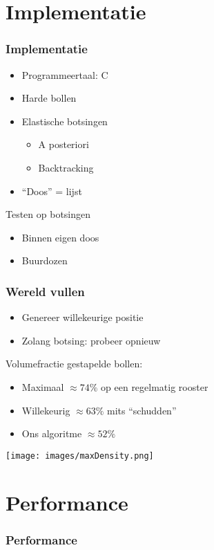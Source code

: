 \documentclass{beamer}
\newcommand{\figscale}[2]{
	\begin{center}
	\scalebox{#1}{
		
	}
	\end{center}
}
\begin{document}
\section{Implementatie}
\begin{frame}
\frametitle{Implementatie}
\begin{itemize}
\item Programmeertaal: C
\item Harde bollen
\item Elastische botsingen
	\begin{itemize}
	\item A posteriori
	\item Backtracking
	\end{itemize}
\item ``Doos'' = lijst
\end{itemize}
Testen op botsingen
\begin{itemize}
\item Binnen eigen doos
\item Buurdozen
\end{itemize}
\end{frame}

\begin{frame}
\frametitle{Wereld vullen}
\begin{itemize}
\item Genereer willekeurige positie
\item Zolang botsing: probeer opnieuw
\end{itemize}

Volumefractie gestapelde bollen:
\begin{itemize}
\item Maximaal $\approx74\%$ op een regelmatig rooster
\item Willekeurig $\approx63\%$ mits ``schudden''
\item Ons algoritme $\approx52\%$
\end{itemize}
\begin{center}
\scalebox{0.45}{
	
}
\texttt{[image: images/maxDensity.png]}
\end{center}
\end{frame}

\section{Performance}
\begin{frame}
\frametitle{Performance}
\figscale{0.8}{fixedPartnum}
\end{frame}
\end{document}
